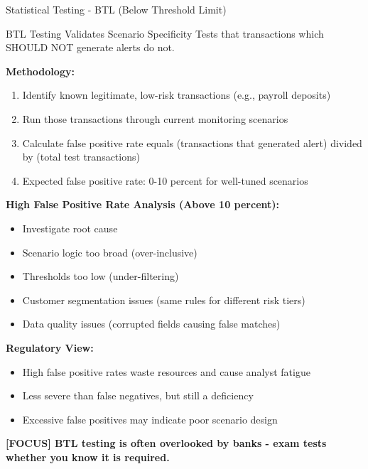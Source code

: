 \documentclass[11pt,a4paper]{beamer}
\newcommand{\examfocus}[1]{\textcolor{orange!80!black}{\textbf{[FOCUS] #1}}}
\begin{document}
	\begin{frame}{Statistical Testing - BTL (Below Threshold Limit)}
		\begin{block}{BTL Testing Validates Scenario Specificity}
			Tests that transactions which SHOULD NOT generate alerts do not.
		\end{block}
		
		\textbf{Methodology:}
		\begin{enumerate}
			\item Identify known legitimate, low-risk transactions (e.g., payroll deposits)
			\item Run those transactions through current monitoring scenarios
			\item Calculate false positive rate equals (transactions that generated alert) divided by (total test transactions)
			\item Expected false positive rate: 0-10 percent for well-tuned scenarios
		\end{enumerate}
		
		\textbf{High False Positive Rate Analysis (Above 10 percent):}
		\begin{itemize}
			\item Investigate root cause
			\item Scenario logic too broad (over-inclusive)
			\item Thresholds too low (under-filtering)
			\item Customer segmentation issues (same rules for different risk tiers)
			\item Data quality issues (corrupted fields causing false matches)
		\end{itemize}
		
		\textbf{Regulatory View:}
		\begin{itemize}
			\item High false positive rates waste resources and cause analyst fatigue
			\item Less severe than false negatives, but still a deficiency
			\item Excessive false positives may indicate poor scenario design
		\end{itemize}
		
		\examfocus{BTL testing is often overlooked by banks - exam tests whether you know it is required.}
	\end{frame}
	
\end{document}
